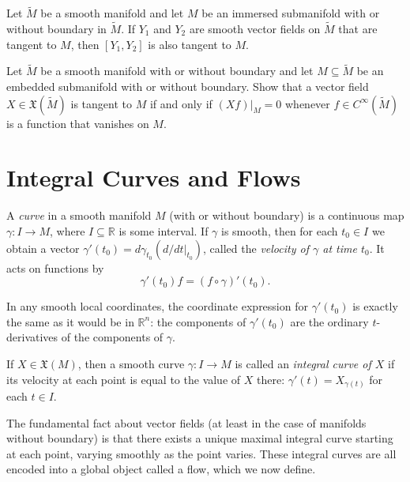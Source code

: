 \begin{corollary}
\label{cor:brackets-vector-fields-tangent-to-submanifolds}
Let $\tilde{M}$ be a smooth manifold and let $M$ be an immersed submanifold with or without boundary in $\tilde{M}$. If $Y_1$ and $Y_2$ are smooth vector fields on $\tilde{M}$ that are tangent to $M$, then $[Y_1, Y_2]$ is also tangent to $M$.
\end{corollary}

\begin{exercise}
\label{exer:tangent-vector-field-on-submanifold}
Let $\tilde{M}$ be a smooth manifold with or without boundary and let $M \subseteq \tilde{M}$ be an embedded submanifold with or without boundary. Show that a vector field $X \in \mathfrak{X}(\tilde{M})$ is tangent to $M$ if and only if $(Xf)|_M = 0$ whenever $f \in C^\infty(\tilde{M})$ is a function that vanishes on $M$.
\end{exercise}

\section{Integral Curves and Flows}

A \emph{curve} in a smooth manifold $M$ (with or without boundary) is a continuous map $\gamma: I \to M$, where $I \subseteq \mathbb{R}$ is some interval. If $\gamma$ is smooth, then for each $t_0 \in I$ we obtain a vector $\gamma'(t_0) = d\gamma_{t_0}(d/dt|_{t_0})$, called the \emph{velocity of $\gamma$ at time $t_0$}. It acts on functions by
\[
\gamma'(t_0) f = (f \circ \gamma)'(t_0).
\]

In any smooth local coordinates, the coordinate expression for $\gamma'(t_0)$ is exactly the same as it would be in $\mathbb{R}^n$: the components of $\gamma'(t_0)$ are the ordinary $t$-derivatives of the components of $\gamma$.

If $X \in \mathfrak{X}(M)$, then a smooth curve $\gamma: I \to M$ is called an \emph{integral curve of $X$} if its velocity at each point is equal to the value of $X$ there: $\gamma'(t) = X_{\gamma(t)}$ for each $t \in I$.

The fundamental fact about vector fields (at least in the case of manifolds without boundary) is that there exists a unique maximal integral curve starting at each point, varying smoothly as the point varies. These integral curves are all encoded into a
global object called a flow, which we now define.

